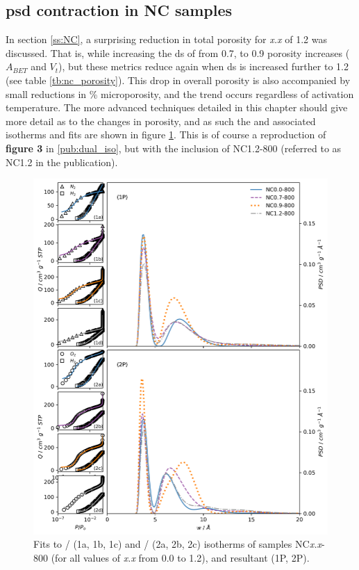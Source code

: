 \subsection{\texorpdfstring{\acrshort{psd} contraction in NC samples}{PSD contraction in NC samples}}

In section \ref{ss:NC}, a surprising reduction in total porosity for \textit{x.x} of 1.2 was discussed. That is, while increasing the \acrfull{ds} of  from 0.7, to 0.9 porosity increases ($A_{BET}$ and $V_t$), but these metrics reduce again when \acrshort{ds} is increased further to 1.2 (see table \ref{tb:nc_porosity}). This drop in overall porosity is also accompanied by small reductions in \% microporosity, and the trend occurs regardless of activation temperature. The more advanced techniques detailed in this chapter should give more detail as to the changes in porosity, and as such the  and associated isotherms and fits are shown in figure \ref{fig:NC_contraction}. This is of course a reproduction of \textbf{figure 3} in \ref{pub:dual_iso}, but with the inclusion of NC1.2-800 (referred to as NC1.2 in the publication).  

\begin{figure}[ht!]
    \centering
    \includegraphics[width=\columnwidth,keepaspectratio]{5-dual_isotherm/figs/NCdual_isopsd.png}
    \caption{Fits to / (1a, 1b, 1c) and / (2a, 2b, 2c) isotherms of samples NC\textit{x.x}-800 (for all values of \textit{x.x} from 0.0 to 1.2), and resultant  (1P, 2P).}
    \label{fig:NC_contraction}
\end{figure}

